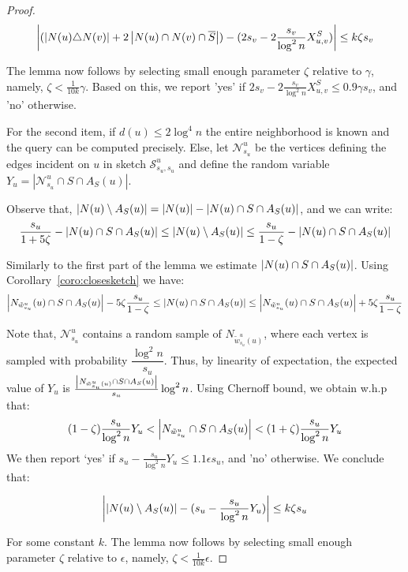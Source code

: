 \documentclass{article}
\newcommand{\Sk}{{\mathcal{S}}}
\begin{document}
\begin{proof}
\[\left|(\left|N(u)\triangle N(v)\right| + 2\left|N(u)\cap N(v)\cap \overline{S}\right|)-(2s_v-2\dfrac{s_v}{\log^2 n}X^S_{u,v})\right|\le k\zeta s_v\] 

The lemma now follows by selecting small enough parameter $\zeta$ relative to $\gamma$, namely, $\zeta < \frac{1}{10k} \gamma$. Based on this, we report 'yes' if $2s_v-2\frac{s_v}{\log^2 n}X^S_{u,v} \leq 0.9\gamma s_v$, and 'no' otherwise.

For the second item, if $d(u) \leq 2\log^4 n$ the entire neighborhood is known and the query can be computed precisely. Else, let ${\mathcal{N}}^{u}_{s_u}$ be the vertices defining the edges incident on $u$ in sketch ${\Sk}^{u}_{s_u,s_u}$ and define the random variable $Y_u=|{\mathcal{N}}^{u}_{s_u} \cap S\cap A_S(u)|$. 

Observe that, $\left|N(u) \setminus A_S(u)\right| = \left|N(u)\right| -\left|N(u) \cap S \cap A_S(u)\right|$, and we can write: 
\begin{equation}
    \frac{s_u}{1+5\zeta}-\left|N(u) \cap S \cap A_S(u)\right| \leq \left|N(u) \setminus A_S(u)\right| \leq \frac{s_u}{1-\zeta}-\left|N(u) \cap S \cap A_S(u)\right|
\end{equation}

Similarly to the first part of the lemma we estimate $\left|N(u) \cap S \cap A_S(u)\right|$. Using Corollary~\ref{coro:closesketch} we have:
\begin{align}
    \left|N_{\tilde{w}^u_{s_u}}(u) \cap S \cap A_S(u)\right|-5\zeta\frac{s_u}{1-\zeta} \leq \left|N(u) \cap S \cap A_S(u)\right| \leq \left|N_{\tilde{w}^u_{s_u}}(u) \cap S \cap A_S(u)\right|+5\zeta\frac{s_u}{1-\zeta}
\end{align} 

Note that, ${\mathcal{N}}^{u}_{s_u}$ contains a random sample of $N_{\tilde{w}_{s_u}^u(u)}$, where each vertex is sampled with probability $\dfrac{\log^2 n}{s_u}$. Thus, by linearity of expectation, the expected value of $Y_u$ is $\frac{\left|N_{\tilde{w}_{s_u}^u(u)} \cap S \cap A_S(u)\right|}{s_u}\log^2 n$. Using Chernoff bound, we obtain w.h.p that:
\begin{equation}
    (1-\zeta)\frac{s_u}{\log^2 n}Y_u < \left|N_{\tilde{w}_{s_u}^u} \cap S \cap A_S(u)\right| < (1+\zeta)\frac{s_u}{\log^2 n}Y_u
\end{equation} 
We then report `yes' if $s_u-\frac{s_u}{\log^2 n}Y_u \leq 1.1 \epsilon s_u$, and 'no' otherwise. We conclude that:

\[\left|\left|N(u)\setminus A_S(u)\right| -(s_u-\dfrac{s_u}{\log^2 n}Y_u)\right|\le k\zeta s_u\] 

For some constant $k$. The lemma now follows by selecting small enough parameter $\zeta$ relative to $\epsilon$, namely, $\zeta < \frac{1}{10k} \epsilon$.
\end{proof}
\end{document}

